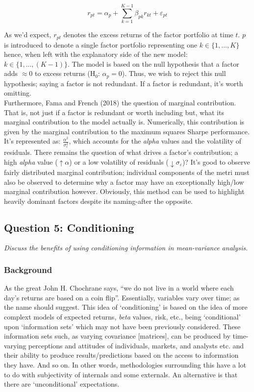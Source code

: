 \documentclass[11pt, english]{article}
\begin{document}
	$$r_{pt}=\alpha_p+\sum_{k=1}^{K-1}\beta_{pk}r_{kt}+\varepsilon_{pt}$$

        As we'd expect, $r_{pt}$ denotes the excess returns of the factor portfolio at time $t$. $p$ is introduced to denote a single factor portfolio representing one $k\in\{1,...,K\}$ hence, when left with the explanatory side of the new model: $k\in\{1,...,(K-1)\}$. The model is based on the null hypothesis that a factor adds $\approx0$ to excess returns (H$_0$: $\alpha_p=0$). Thus, we wish to reject this null hypothesis; saying a factor is not redundant. If a factor is redundant, it's worth omitting.\\

        Furthermore, Fama and French (2018) the question of marginal contribution. That is, not just if a factor is redundant or worth including but, what its marginal contribution to the model actually is. Numerically, this contribution is given by the marginal contribution to the maximum squares Sharpe performance. It's represented as: $\frac{\alpha^2}{\sigma_{\varepsilon}^2}$, which accounts for the \textit{alpha} values and the volatility of residuals. There remains the question of what drives a factor’s contribution; a high \textit{alpha} value ($\uparrow\alpha$) or a low volatility of residuals ($\downarrow\sigma_{\varepsilon}$)? It's good to observe fairly distributed marginal contribution; individual components of the metri must also be observed to determine why a factor may have an exceptionally high/low marginal contribution however. Obviously, this method can be used to highlight heavily dominant factors despite its naming-after the opposite.

	\newpage

	\subsection{Question 5: Conditioning}

	\textit{Discuss the benefits of using conditioning information in mean-variance analysis.}

		\subsubsection*{Background}

	As the great John H. Chochrane says, ``we do not live in a world where each day's returns are based on a coin flip''. Essentially, variables vary over time; as the name should suggest. This idea of `conditioning' is based on the idea of more complext models of expected returns, \textit{beta} values, risk, etc., being `conditional' upon `information sets' which may not have been previously considered. These information sets such, as varying covariance [matrices], can be produced by time-varying perceptions and attitudes of individuals, markets, and analysts etc. and their ability to produce results/predictions based on the access to information they have. And so on. In other words, methodologies surrounding this have a lot to do with subjectivity of internals and some externals. An alternative is that there are `unconditional' expectations.\\
	
\end{document}
